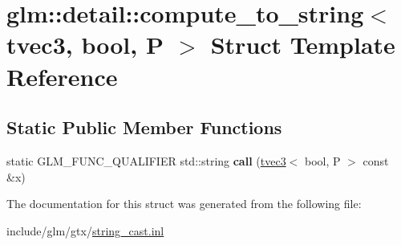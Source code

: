 \hypertarget{structglm_1_1detail_1_1compute__to__string_3_01tvec3_00_01bool_00_01P_01_4}{}\section{glm\+:\+:detail\+:\+:compute\+\_\+to\+\_\+string$<$ tvec3, bool, P $>$ Struct Template Reference}
\label{structglm_1_1detail_1_1compute__to__string_3_01tvec3_00_01bool_00_01P_01_4}
\subsection*{Static Public Member Functions}
\begin{DoxyCompactItemize}
\item 
\mbox{\label{structglm_1_1detail_1_1compute__to__string_3_01tvec3_00_01bool_00_01P_01_4_abd2a1017b5cd9b3bcb514189dd4814b9}} 
static G\+L\+M\+\_\+\+F\+U\+N\+C\+\_\+\+Q\+U\+A\+L\+I\+F\+I\+ER std\+::string {\bfseries call} (\hyperlink{structglm_1_1tvec3}{tvec3}$<$ bool, P $>$ const \&x)
\end{DoxyCompactItemize}


The documentation for this struct was generated from the following file\+:\begin{DoxyCompactItemize}
\item 
include/glm/gtx/\hyperlink{string__cast_8inl}{string\+\_\+cast.\+inl}\end{DoxyCompactItemize}
